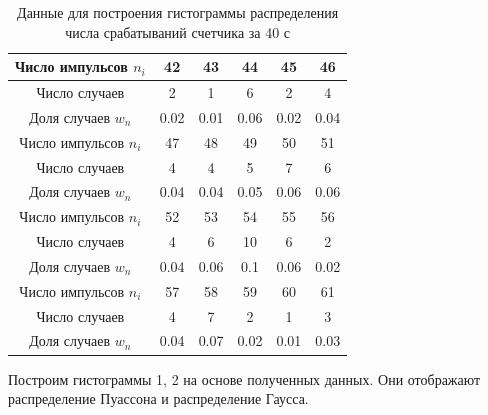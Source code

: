 \documentclass[a4paper,12pt]{article}
\begin{document}
\begin{table}[H]
\centering
\caption{Данные для построения гистограммы распределения числа срабатываний счетчика за 40 с} \label{40c}
\begin{tabular}{|c|c|c|c|c|c|}
\hline
Число импульсов $n_i$ & 42 & 43 & 44 & 45 & 46\\
\hline
Число случаев & 2 & 1 & 6 & 2 & 4 \\
\hline
Доля случаев $w_n$ & 0.02 & 0.01 & 0.06 & 0.02 & 0.04 \\
\hline
\hline
Число импульсов $n_i$ & 47 & 48 & 49 & 50 & 51\\
\hline
Число случаев & 4 & 4 & 5 & 7 & 6 \\
\hline
Доля случаев $w_n$ & 0.04 & 0.04 & 0.05 & 0.06 & 0.06 \\
\hline
\hline
Число импульсов $n_i$ & 52 & 53 & 54 & 55 & 56\\
\hline
Число случаев & 4 & 6 & 10 & 6 & 2 \\
\hline
Доля случаев $w_n$ & 0.04 & 0.06 & 0.1 & 0.06 & 0.02 \\
\hline
\hline
Число импульсов $n_i$ & 57 & 58 & 59 & 60 & 61\\
\hline
Число случаев & 4 & 7 & 2 & 1 & 3 \\
\hline
Доля случаев $w_n$ & 0.04 & 0.07 & 0.02 & 0.01 & 0.03 \\

\hline

\end{tabular}
\end{table}

Построим гистограммы 1, 2 на основе полученных данных. Они отображают распределение Пуассона и распределение Гаусса.
\end{document}
